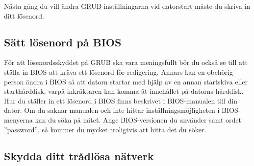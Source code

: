 \documentclass[a4paper,final]{memoir} %
\begin{document}
Nästa gång du vill ändra GRUB-inställningarna vid datorstart måste du skriva in ditt lösenord. 


\subsection{Sätt lösenord på BIOS}


För att lösenordsskyddet på GRUB ska vara meningsfullt bör du också se till att ställa in BIOS att kräva ett lösenord för redigering. Annars kan en obehörig person ändra i BIOS så att datorn startar med hjälp av en annan startskiva eller starthårddisk, varpå inkräktaren kan komma åt innehållet på datorns hårddisk. Hur du ställer in ett lösenord i BIOS finns beskrivet i BIOS-manualen till din dator. Om du saknar manualen och inte hittar inställningsmöjligheten i BIOS-menyerna kan du söka på nätet. Ange BIOS-versionen du använder samt ordet ''password'', så kommer du mycket troligtvis att hitta det du söker.

\subsection{Skydda ditt trådlösa nätverk}
\end{document}
